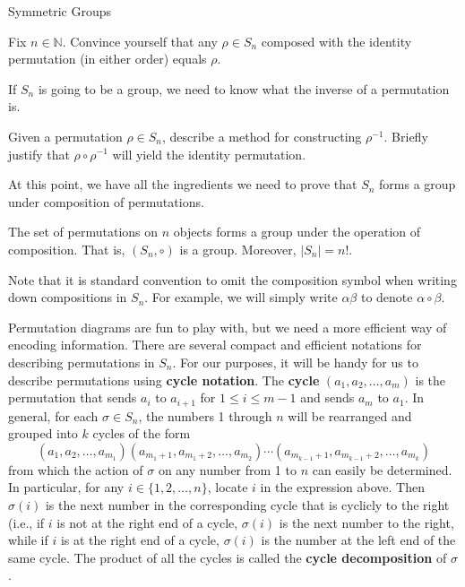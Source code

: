 \begin{section}{Symmetric Groups}
\begin{problem}
Fix $n\in\mathbb{N}$.  Convince yourself that any $\rho\in S_n$ composed with the identity permutation (in either order) equals $\rho$.
\end{problem}

If $S_n$ is going to be a group, we need to know what the inverse of a permutation is.

\begin{problem}
Given a permutation $\rho\in S_n$, describe a method for constructing $\rho^{-1}$.  Briefly justify that $\rho \circ \rho^{-1}$ will yield the identity permutation.
\end{problem}

At this point, we have all the ingredients we need to prove that $S_n$ forms a group under composition of permutations.

\begin{theorem}
The set of permutations on $n$ objects forms a group under the operation of composition.  That is, $(S_n,\circ)$ is a group.  Moreover, $|S_n|=n!$.
\end{theorem}

Note that it is standard convention to omit the composition symbol when writing down compositions in $S_n$.  For example, we will simply write $\alpha\beta$ to denote $\alpha \circ \beta$.

Permutation diagrams are fun to play with, but we need a more efficient way of encoding information.  There are several compact and efficient notations for describing permutations in $S_n$. For our purposes, it will be handy for us to describe permutations using \textbf{cycle notation}. The \textbf{cycle} $(a_1,a_2,\ldots, a_m)$ is the permutation that sends $a_i$ to $a_{i+1}$ for $1\leq i\leq m-1$ and sends $a_m$ to $a_1$. In general, for each $\sigma\in S_n$, the numbers 1 through $n$ will be rearranged and grouped into $k$ cycles of the form
\[
(a_1,a_2,\ldots, a_{m_1})(a_{m_1+1},a_{m_1+2},\ldots,a_{m_2})\cdots (a_{m_{k-1}+1},a_{m_{k-1}+2},\ldots,a_{m_k})
\]
from which the action of $\sigma$ on any number from 1 to $n$ can easily be determined.  In particular, for any $i\in\{1,2,\ldots,n\}$, locate $i$ in the expression above.  Then $\sigma(i)$ is the next number in the corresponding cycle that is cyclicly to the right (i.e., if $i$ is not at the right end of a cycle, $\sigma(i)$ is the next number to the right, while if $i$ is at the right end of a cycle, $\sigma(i)$ is the number at the left end of the same cycle. The product of all the cycles is called the \textbf{cycle decomposition} of $\sigma$.  


\end{section}
